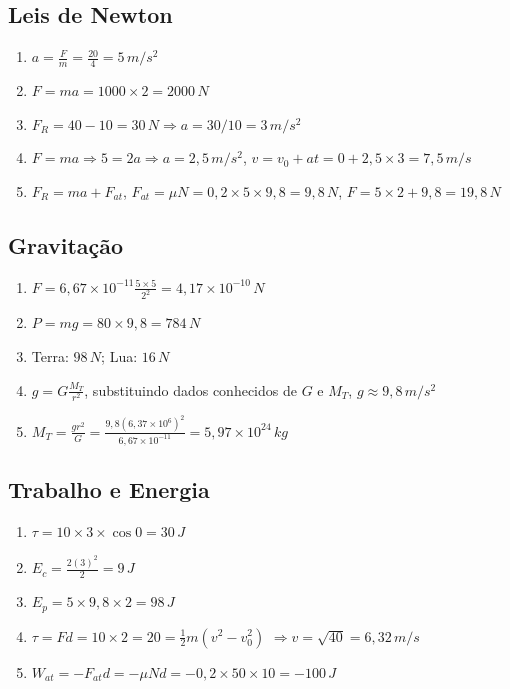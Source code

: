 \documentclass[a4paper,12pt]{article}
\begin{document}
\subsection{Leis de Newton}
\begin{enumerate}
\item $a = \frac{F}{m} = \frac{20}{4} = 5\,m/s^2$
\item $F = ma = 1000 \times 2 = 2000\,N$
\item $F_R = 40 - 10 = 30\,N \Rightarrow a = 30/10 = 3\,m/s^2$
\item $F = ma \Rightarrow 5 = 2a \Rightarrow a = 2{,}5\,m/s^2$, $v = v_0 + at = 0 + 2{,}5 \times 3 = 7{,}5\,m/s$
\item $F_R = ma + F_{at}$, $F_{at} = \mu N = 0{,}2 \times 5 \times 9{,}8 = 9{,}8\,N$, $F = 5 \times 2 + 9{,}8 = 19{,}8\,N$
\end{enumerate}

\subsection{Gravitação}
\begin{enumerate}
\item $F = 6{,}67\times10^{-11} \frac{5\times5}{2^2} = 4{,}17\times10^{-10}\,N$
\item $P = mg = 80 \times 9{,}8 = 784\,N$
\item Terra: $98\,N$; Lua: $16\,N$
\item $g = G\frac{M_T}{r^2}$, substituindo dados conhecidos de $G$ e $M_T$, $g \approx 9{,}8\,m/s^2$
\item $M_T = \frac{gr^2}{G} = \frac{9{,}8(6{,}37\times10^6)^2}{6{,}67\times10^{-11}} = 5{,}97\times10^{24}\,kg$
\end{enumerate}

\subsection{Trabalho e Energia}
\begin{enumerate}
\item $\tau = 10\times3\times\cos0 = 30\,J$
\item $E_c = \frac{2(3)^2}{2} = 9\,J$
\item $E_p = 5\times9{,}8\times2 = 98\,J$
\item $\tau = Fd = 10\times2 = 20 = \frac{1}{2}m(v^2 - v_0^2)$ $\Rightarrow v = \sqrt{40} = 6{,}32\,m/s$
\item $W_{at} = -F_{at}d = -\mu N d = -0{,}2\times50\times10 = -100\,J$
\end{enumerate}
\end{document}
